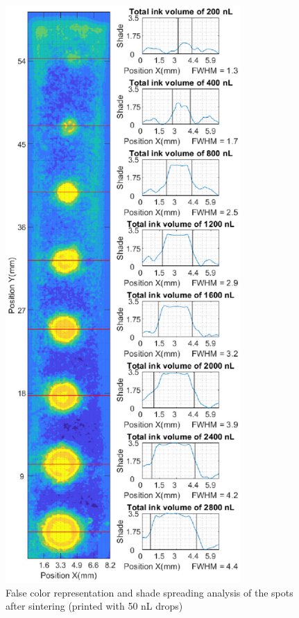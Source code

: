 \begin{figure}[H]
	\centering
	\includegraphics[width=0.8\textwidth]{grafiken/drops50.eps}
	\caption{False color representation and shade spreading analysis of the spots after sintering (printed with 50 nL drops)}
	\label{fig:drops50}
\end{figure} 


